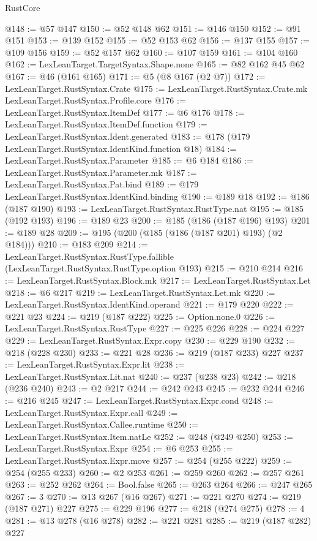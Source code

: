 \begin{lexlean}{RustCore}
\begin{coremodule}
@148 := @57 @147
@150 := @52 @148 @62
@151 := @146 @150
@152 := @91 @151
@153 := @139 @152
@155 := @52 @153 @62
@156 := @137 @155
@157 := @109 @156
@159 := @52 @157 @62
@160 := @107 @159
@161 := @104 @160
@162 := LexLeanTarget.TargetSyntax.Shape.none
@165 := @82 @162 @45 @62
@167 := @46 (@161 @165)
@171 := @5 (@8 @167 (@2 @7))
@172 := LexLeanTarget.RustSyntax.Crate
@175 := LexLeanTarget.RustSyntax.Crate.mk LexLeanTarget.RustSyntax.Profile.core
@176 := LexLeanTarget.RustSyntax.ItemDef
@177 := @6 @176
@178 := LexLeanTarget.RustSyntax.ItemDef.function
@179 := LexLeanTarget.RustSyntax.Ident.generated
@183 := @178 (@179 LexLeanTarget.RustSyntax.IdentKind.function @18)
@184 := LexLeanTarget.RustSyntax.Parameter
@185 := @6 @184
@186 := LexLeanTarget.RustSyntax.Parameter.mk
@187 := LexLeanTarget.RustSyntax.Pat.bind
@189 := @179 LexLeanTarget.RustSyntax.IdentKind.binding
@190 := @189 @18
@192 := @186 (@187 @190)
@193 := LexLeanTarget.RustSyntax.RustType.nat
@195 := @185 (@192 @193)
@196 := @189 @23
@200 := @185 (@186 (@187 @196) @193)
@201 := @189 @28
@209 := @195 (@200 (@185 (@186 (@187 @201) @193) (@2 @184)))
@210 := @183 @209
@214 := LexLeanTarget.RustSyntax.RustType.fallible (LexLeanTarget.RustSyntax.RustType.option @193)
@215 := @210 @214
@216 := LexLeanTarget.RustSyntax.Block.mk
@217 := LexLeanTarget.RustSyntax.Let
@218 := @6 @217
@219 := LexLeanTarget.RustSyntax.Let.mk
@220 := LexLeanTarget.RustSyntax.IdentKind.operand
@221 := @179 @220
@222 := @221 @23
@224 := @219 (@187 @222)
@225 := Option.none.{0}
@226 := LexLeanTarget.RustSyntax.RustType
@227 := @225 @226
@228 := @224 @227
@229 := LexLeanTarget.RustSyntax.Expr.copy
@230 := @229 @190
@232 := @218 (@228 @230)
@233 := @221 @28
@236 := @219 (@187 @233) @227
@237 := LexLeanTarget.RustSyntax.Expr.lit
@238 := LexLeanTarget.RustSyntax.Lit.nat
@240 := @237 (@238 @23)
@242 := @218 (@236 @240)
@243 := @2 @217
@244 := @242 @243
@245 := @232 @244
@246 := @216 @245
@247 := LexLeanTarget.RustSyntax.Expr.cond
@248 := LexLeanTarget.RustSyntax.Expr.call
@249 := LexLeanTarget.RustSyntax.Callee.runtime
@250 := LexLeanTarget.RustSyntax.Item.natLe
@252 := @248 (@249 @250)
@253 := LexLeanTarget.RustSyntax.Expr
@254 := @6 @253
@255 := LexLeanTarget.RustSyntax.Expr.move
@257 := @254 (@255 @222)
@259 := @254 (@255 @233)
@260 := @2 @253
@261 := @259 @260
@262 := @257 @261
@263 := @252 @262
@264 := Bool.false
@265 := @263 @264
@266 := @247 @265
@267 := 3
@270 := @13 @267 (@16 @267)
@271 := @221 @270
@274 := @219 (@187 @271) @227
@275 := @229 @196
@277 := @218 (@274 @275)
@278 := 4
@281 := @13 @278 (@16 @278)
@282 := @221 @281
@285 := @219 (@187 @282) @227

\end{coremodule}
\end{lexlean}
